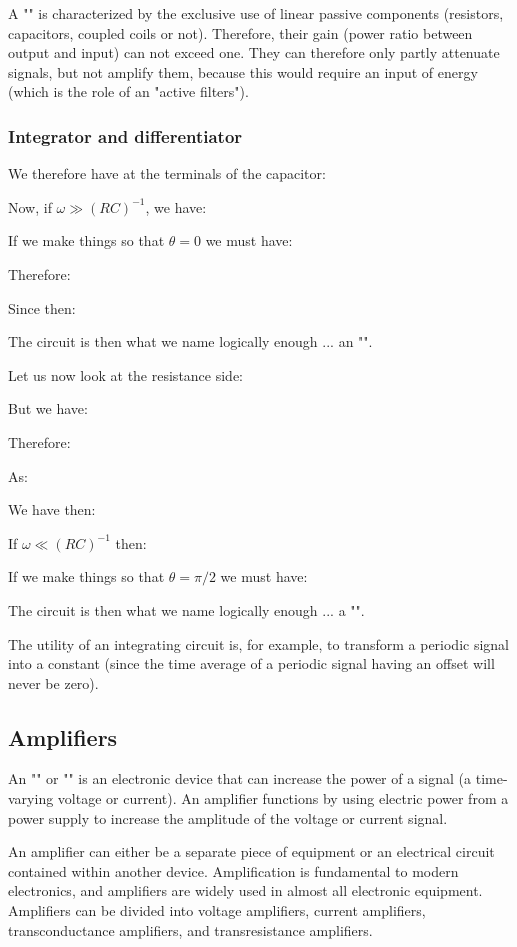 	A "" is characterized by the exclusive use of linear passive components (resistors, capacitors, coupled coils or not). Therefore, their gain (power ratio between output and input) can not exceed one. They can therefore only partly attenuate signals, but not amplify them, because this would require an input of energy (which is the role of an "active filters").
	
	\subsubsection{Integrator and differentiator}
	We therefore have at the terminals of the capacitor:
	
	Now, if $\omega \gg (RC)^{-1}$, we have:
	
	If we make things so that $\theta=0$ we must have:
	
	Therefore:
	
	Since then:
	
	The circuit is then what we name logically enough ... an "".

	Let us now look at the resistance side:
	
	But we have:
	
	Therefore:
	
	As:
	
	We have then:
	
	If $\omega \ll (RC)^{-1}$ then:
	
	If we make things so that $\theta=\pi/2$ we must have:
	
	The circuit is then what we name logically enough ... a "".

	The utility of an integrating circuit is, for example, to transform a periodic signal into a constant (since the time average of a periodic signal having an offset will never be zero).
	
	\pagebreak
	\subsection{Amplifiers}
	An "" or "" is an electronic device that can increase the power of a signal (a time-varying voltage or current). An amplifier functions by using electric power from a power supply to increase the amplitude of the voltage or current signal.
	
	 An amplifier can either be a separate piece of equipment or an electrical circuit contained within another device. Amplification is fundamental to modern electronics, and amplifiers are widely used in almost all electronic equipment. Amplifiers can be divided into voltage amplifiers, current amplifiers, transconductance amplifiers, and transresistance amplifiers. 
	
